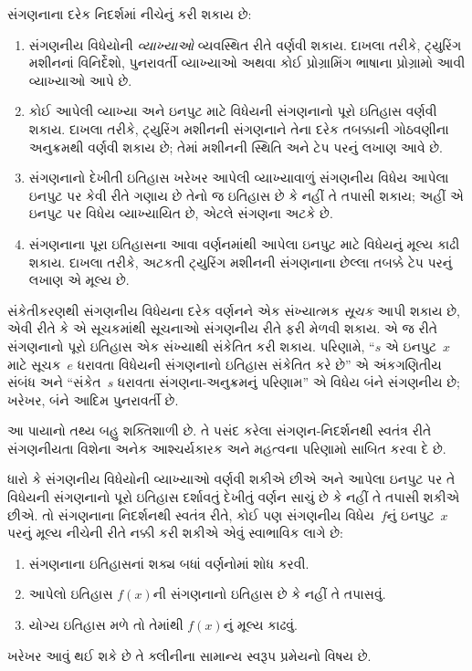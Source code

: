 સંગણનાના દરેક નિદર્શમાં નીચેનું કરી શકાય છે:
\begin{enumerate}
\item સંગણનીય વિધેયોની \emph{વ્યાખ્યાઓ} વ્યવસ્થિત રીતે વર્ણવી શકાય.
  દાખલા તરીકે, ટ્યુરિંગ મશીનનાં વિનિર્દેશો, પુનરાવર્તી વ્યાખ્યાઓ
  અથવા કોઈ પ્રોગ્રામિંગ ભાષાના પ્રોગ્રામો આવી વ્યાખ્યાઓ આપે છે.
\item કોઈ આપેલી વ્યાખ્યા અને ઇનપુટ માટે વિધેયની સંગણનાનો પૂરો
  ઇતિહાસ વર્ણવી શકાય. દાખલા તરીકે, ટ્યુરિંગ મશીનની સંગણનાને
  તેના દરેક તબક્કાની ગોઠવણીના અનુક્રમથી વર્ણવી શકાય છે; તેમાં
  મશીનની સ્થિતિ અને ટેપ પરનું લખાણ આવે છે.
\item સંગણનાનો દેખીતી ઇતિહાસ ખરેખર આપેલી વ્યાખ્યાવાળું સંગણનીય
  વિધેય આપેલા ઇનપુટ પર કેવી રીતે ગણાય છે તેનો જ ઇતિહાસ છે કે
  નહીં તે તપાસી શકાય; અહીં એ ઇનપુટ પર વિધેય વ્યાખ્યાયિત છે,
  એટલે સંગણના અટકે છે.
\item સંગણનાના પૂરા ઇતિહાસના આવા વર્ણનમાંથી આપેલા ઇનપુટ માટે
  વિધેયનું મૂલ્ય કાઢી શકાય. દાખલા તરીકે, અટકતી ટ્યુરિંગ મશીનની
  સંગણનાના છેલ્લા તબક્કે ટેપ પરનું લખાણ એ મૂલ્ય છે.
\end{enumerate}

સંકેતીકરણથી સંગણનીય વિધેયના દરેક વર્ણનને એક સંખ્યાત્મક
\emph{સૂચક} આપી શકાય છે, એવી રીતે કે એ સૂચકમાંથી સૂચનાઓ
સંગણનીય રીતે ફરી મેળવી શકાય. એ જ રીતે સંગણનાનો પૂરો ઇતિહાસ
એક સંખ્યાથી સંકેતિત કરી શકાય. પરિણામે, ``$s$ એ ઇનપુટ~$x$
માટે સૂચક~$e$ ધરાવતા વિધેયની સંગણનાનો ઇતિહાસ સંકેતિત કરે છે''
એ અંકગણિતીય સંબંધ અને ``સંકેત~$s$ ધરાવતા સંગણના-અનુક્રમનું
પરિણામ'' એ વિધેય બંને સંગણનીય છે; ખરેખર, બંને આદિમ પુનરાવર્તી છે.

આ પાયાનો તથ્ય બહુ શક્તિશાળી છે. તે પસંદ કરેલા સંગણન-નિદર્શનથી
સ્વતંત્ર રીતે સંગણનીયતા વિશેના અનેક આશ્ચર્યકારક અને મહત્વના
પરિણામો સાબિત કરવા દે છે.
\endgroup


\begingroup
\makeatletter{}\makeatother

\label{guunit:OLP-0231}


ધારો કે સંગણનીય વિધેયોની વ્યાખ્યાઓ વર્ણવી શકીએ છીએ અને આપેલા
ઇનપુટ પર તે વિધેયની સંગણનાનો પૂરો ઇતિહાસ દર્શાવતું દેખીતું
વર્ણન સાચું છે કે નહીં તે તપાસી શકીએ છીએ. તો સંગણનાના નિદર્શનથી
સ્વતંત્ર રીતે, કોઈ પણ સંગણનીય વિધેય~$f$નું ઇનપુટ~$x$ પરનું
મૂલ્ય નીચેની રીતે નક્કી કરી શકીએ એવું સ્વાભાવિક લાગે છે:
\begin{enumerate}
  \item સંગણનાના ઇતિહાસનાં શક્ય બધાં વર્ણનોમાં શોધ કરવી.
  \item આપેલો ઇતિહાસ $f(x)$ની સંગણનાનો ઇતિહાસ છે કે નહીં તે તપાસવું.
  \item યોગ્ય ઇતિહાસ મળે તો તેમાંથી $f(x)$નું મૂલ્ય કાઢવું.
\end{enumerate}
ખરેખર આવું થઈ શકે છે તે ક્લીનીના સામાન્ય સ્વરૂપ પ્રમેયનો વિષય છે.

